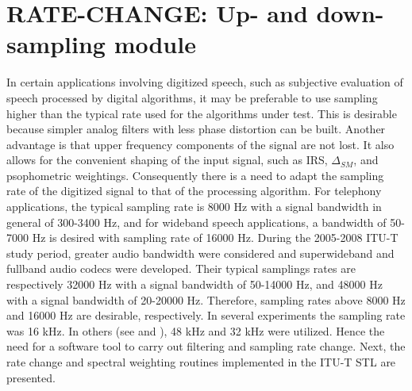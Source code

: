 \chapter{RATE-CHANGE: Up- and down-sampling module}

In certain applications involving digitized speech, such as
subjective evaluation of speech processed by digital algorithms, it
may be preferable to use sampling higher than the typical rate used
for the algorithms under test. This is desirable because simpler
analog filters with less phase distortion can be built. Another
advantage is that upper frequency components of the signal are not
lost. It also allows for the convenient shaping of the input signal,
such as IRS, $\Delta_{SM}$, and psophometric weightings.
Consequently there is a need to adapt the sampling rate of the
digitized signal to that of the processing algorithm.  For telephony
applications, the typical sampling rate is 8000 Hz with a signal
bandwidth in general of 300-3400 Hz, and for wideband speech
applications, a bandwidth of 50-7000 Hz is desired with sampling
rate of 16000 Hz. During the 2005-2008 ITU-T study period, greater audio bandwidth
were considered and superwideband and fullband audio codecs were developed. 
Their typical samplings rates are respectively 32000 Hz with a signal bandwidth 
of 50-14000 Hz, and 48000 Hz with a signal bandwidth of 20-20000 Hz.
Therefore, sampling rates above 8000 Hz and 16000
Hz are desirable, respectively. In several experiments
\cite{LDCELP-voitests} the sampling rate was 16 kHz. In others (see
\cite{ETSI-half} and \cite{AC-05-16}), 48 kHz and 32 kHz were
utilized. Hence the need for a software tool to carry out filtering
and sampling rate change. Next, the rate change and spectral
weighting routines implemented in the ITU-T STL are presented.


